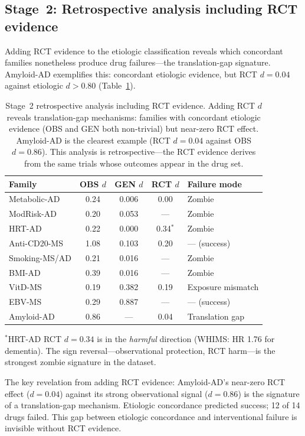 \documentclass[11pt]{article}
\begin{document}
\subsection{Stage~2: Retrospective analysis including RCT evidence}
\label{sec:stage2}

Adding RCT evidence to the etiologic classification reveals which concordant families nonetheless produce drug failures---the translation-gap signature. Amyloid-AD exemplifies this: concordant etiologic evidence, but RCT $d = 0.04$ against etiologic $d > 0.80$ (Table~\ref{tab:stage2}).

\begin{table}[t]
\centering
\caption{Stage~2 retrospective analysis including RCT evidence. Adding RCT $d$ reveals translation-gap mechanisms: families with concordant etiologic evidence (OBS and GEN both non-trivial) but near-zero RCT effect. Amyloid-AD is the clearest example (RCT $d = 0.04$ against OBS $d = 0.86$). This analysis is retrospective---the RCT evidence derives from the same trials whose outcomes appear in the drug set.}
\label{tab:stage2}
\begin{tabular}{lcccl}
\toprule
Family & OBS $d$ & GEN $d$ & RCT $d$ & Failure mode \\
\midrule
Metabolic-AD & 0.24 & 0.006 & 0.00 & Zombie \\
ModRisk-AD & 0.20 & 0.053 & --- & Zombie \\
HRT-AD & 0.22 & 0.000 & 0.34$^*$ & Zombie \\
Anti-CD20-MS & 1.08 & 0.103 & 0.20 & --- (success) \\
Smoking-MS/AD & 0.21 & 0.016 & --- & Zombie \\
BMI-AD & 0.39 & 0.016 & --- & Zombie \\
VitD-MS & 0.19 & 0.382 & 0.19 & Exposure mismatch \\
EBV-MS & 0.29 & 0.887 & --- & --- (success) \\
Amyloid-AD & 0.86 & --- & 0.04 & Translation gap \\
\bottomrule
\end{tabular}

\vspace{1mm}
{\footnotesize $^*$HRT-AD RCT $d = 0.34$ is in the \emph{harmful} direction (WHIMS: HR 1.76 for dementia). The sign reversal---observational protection, RCT harm---is the strongest zombie signature in the dataset.}
\end{table}

The key revelation from adding RCT evidence: Amyloid-AD's near-zero RCT effect ($d = 0.04$) against its strong observational signal ($d = 0.86$) is the signature of a translation-gap mechanism. Etiologic concordance predicted success; 12 of 14 drugs failed. This gap between etiologic concordance and interventional failure is invisible without RCT evidence.
\end{document}
